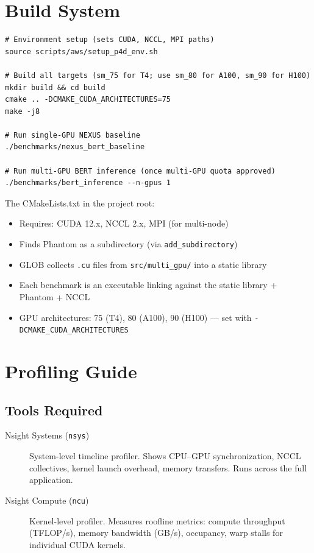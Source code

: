 \documentclass[11pt,letterpaper]{article}
\begin{document}
\section{Build System}
\label{sec:build}

\begin{lstlisting}[style=bash, caption=Building on AWS g4dn.2xlarge (T4 GPU)]
# Environment setup (sets CUDA, NCCL, MPI paths)
source scripts/aws/setup_p4d_env.sh

# Build all targets (sm_75 for T4; use sm_80 for A100, sm_90 for H100)
mkdir build && cd build
cmake .. -DCMAKE_CUDA_ARCHITECTURES=75
make -j8

# Run single-GPU NEXUS baseline
./benchmarks/nexus_bert_baseline

# Run multi-GPU BERT inference (once multi-GPU quota approved)
./benchmarks/bert_inference --n-gpus 1
\end{lstlisting}

The CMakeLists.txt in the project root:
\begin{itemize}
  \item Requires: CUDA 12.x, NCCL 2.x, MPI (for multi-node)
  \item Finds Phantom as a subdirectory (via \texttt{add\_subdirectory})
  \item GLOB collects \texttt{.cu} files from \texttt{src/multi\_gpu/} into a static library
  \item Each benchmark is an executable linking against the static library + Phantom + NCCL
  \item GPU architectures: 75 (T4), 80 (A100), 90 (H100) --- set with \texttt{-DCMAKE\_CUDA\_ARCHITECTURES}
\end{itemize}

\section{Profiling Guide}
\label{sec:profiling}

\subsection{Tools Required}

\begin{description}
  \item[Nsight Systems (\texttt{nsys})] System-level timeline profiler. Shows CPU--GPU
    synchronization, NCCL collectives, kernel launch overhead, memory transfers. Runs
    across the full application.
  \item[Nsight Compute (\texttt{ncu})] Kernel-level profiler. Measures roofline
    metrics: compute throughput (TFLOP/s), memory bandwidth (GB/s), occupancy, warp
    stalls for individual CUDA kernels.
\end{description}
\end{document}
